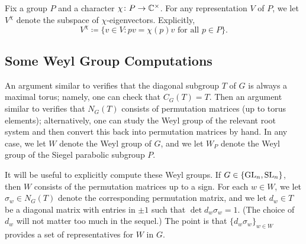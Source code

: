 \begin{notation}
    Fix a group $P$ and a character $\chi\colon P\to\mathbb C^\times$. For any representation $V$ of $P$, we let $V^\chi$ denote the subspace of $\chi$-eigenvectors. Explicitly,
    \[V^\chi\coloneqq\{v\in V:pv=\chi(p)v\text{ for all }p\in P\}.\]
\end{notation}

\subsection{Some Weyl Group Computations}
An argument similar to \cite[Example~17.88]{milne-alg-group} verifies that the diagonal subgroup $T$ of $G$ is always a maximal torus; namely, one can check that $C_G(T)=T$. Then an argument similar to \cite[Example~17.42]{milne-alg-group} verifies that $N_G(T)$ consists of permutation matrices (up to torus elements); alternatively, one can study the Weyl group of the relevant root system and then convert this back into permutation matrices by hand. In any case, we let $W$ denote the Weyl group of $G$, and we let $W_P$ denote the Weyl group of the Siegel parabolic subgroup $P$.

It will be useful to explicitly compute these Weyl groups. If $G\in\{\mathrm{GL}_n,\mathrm{SL}_n\}$, then $W$ consists of the permutation matrices up to a sign. For each $w\in W$, we let $\sigma_w\in N_G(T)$ denote the corresponding permutation matrix, and we let $d_w\in T$ be a diagonal matrix with entries in $\pm1$ such that $\det d_w\sigma_w=1$. (The choice of $d_w$ will not matter too much in the sequel.) The point is that $\{d_w\sigma_w\}_{w\in W}$ provides a set of representatives for $W$ in $G$.

